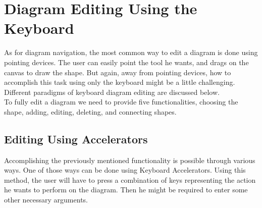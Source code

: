 
\section{Diagram Editing Using the Keyboard}
As for diagram navigation, the most common way to edit a diagram is done using pointing devices. The user can easily point the tool he wants, and drags on the canvas to draw the shape. But again, away from pointing devices, how to accomplish this task using only the keyboard might be a little challenging. Different paradigms of keyboard diagram editing are discussed below.\\
To fully edit a diagram we need to provide five functionalities, choosing the shape, adding, editing, deleting, and connecting shapes.

\subsection{Editing Using Accelerators}
Accomplishing the previously mentioned functionality is possible through various ways. One of those ways can be done using Keyboard Accelerators. Using this method, the user will have to press a combination of keys representing the action he wants to perform on the diagram. Then he might be required to enter some other necessary arguments.

